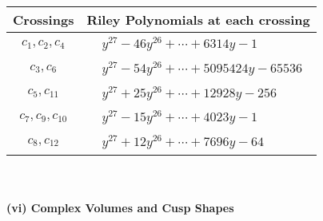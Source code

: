 \documentclass[1p]{elsarticle_modified}
\theoremstyle{definition}
\begin{document}
\begin{tabular}{m{50pt}|m{274pt}}
Crossings & \hspace{64pt}Riley Polynomials at each crossing \\
\hline $$\begin{aligned}c_{1},c_{2},c_{4}\end{aligned}$$&$\begin{aligned}
&y^{27}-46 y^{26}+\cdots+6314 y-1
\end{aligned}$\\
\hline $$\begin{aligned}c_{3},c_{6}\end{aligned}$$&$\begin{aligned}
&y^{27}-54 y^{26}+\cdots+5095424 y-65536
\end{aligned}$\\
\hline $$\begin{aligned}c_{5},c_{11}\end{aligned}$$&$\begin{aligned}
&y^{27}+25 y^{26}+\cdots+12928 y-256
\end{aligned}$\\
\hline $$\begin{aligned}c_{7},c_{9},c_{10}\end{aligned}$$&$\begin{aligned}
&y^{27}-15 y^{26}+\cdots+4023 y-1
\end{aligned}$\\
\hline $$\begin{aligned}c_{8},c_{12}\end{aligned}$$&$\begin{aligned}
&y^{27}+12 y^{26}+\cdots+7696 y-64
\end{aligned}$\\
\hline
\end{tabular}\\~\\
\newpage\flushleft \textbf{(vi) Complex Volumes and Cusp Shapes}
\end{document}
